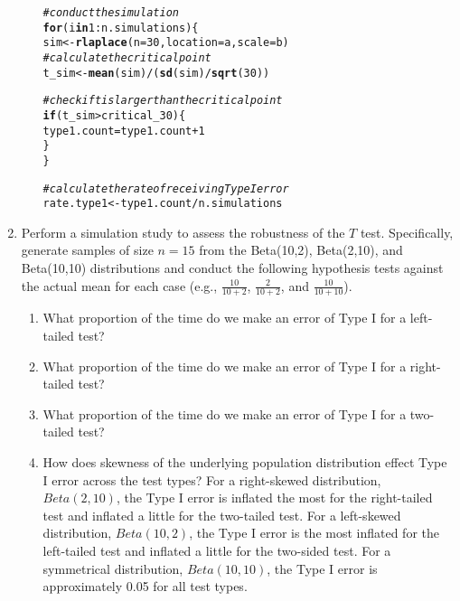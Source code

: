 \documentclass{article}\usepackage[]{graphicx}\usepackage[]{xcolor}
\makeatletter
\newcommand{\hlnum}[1]{\textcolor[rgb]{0.686,0.059,0.569}{#1}}%
\newcommand{\hlcom}[1]{\textcolor[rgb]{0.678,0.584,0.686}{\textit{#1}}}%
\newcommand{\hlopt}[1]{\textcolor[rgb]{0,0,0}{#1}}%
\newcommand{\hldef}[1]{\textcolor[rgb]{0.345,0.345,0.345}{#1}}%
\newcommand{\hlkwa}[1]{\textcolor[rgb]{0.161,0.373,0.58}{\textbf{#1}}}%
\newcommand{\hlkwb}[1]{\textcolor[rgb]{0.69,0.353,0.396}{#1}}%
\newcommand{\hlkwc}[1]{\textcolor[rgb]{0.333,0.667,0.333}{#1}}%
\newcommand{\hlkwd}[1]{\textcolor[rgb]{0.737,0.353,0.396}{\textbf{#1}}}%
\newenvironment{kframe}{%
 \def\at@end@of@kframe{}%
 \ifinner\ifhmode%
  \def\at@end@of@kframe{\end{minipage}}%
  \begin{minipage}{\columnwidth}%
 \fi\fi%
 \def\FrameCommand##1{\hskip\@totalleftmargin \hskip-\fboxsep
 \colorbox{shadecolor}{##1}\hskip-\fboxsep
     \hskip-\linewidth \hskip-\@totalleftmargin \hskip\columnwidth}%
 \MakeFramed {\advance\hsize-\width
   \@totalleftmargin\z@ \linewidth\hsize
   \@setminipage}}%
 {\par\unskip\endMakeFramed%
 \at@end@of@kframe}
\newenvironment{knitrout}{}{} %
\makeatother
\begin{document}
\begin{enumerate}
\begin{enumerate}
\begin{knitrout}
\begin{kframe}
\begin{alltt}
\hlcom{#conduct the simulation}
\hlkwa{for} \hldef{(i} \hlkwa{in} \hlnum{1}\hlopt{:}\hldef{n.simulations)\{}
\hldef{sim} \hlkwb{<-} \hlkwd{rlaplace}\hldef{(}\hlkwc{n} \hldef{=} \hlnum{30}\hldef{,} \hlkwc{location} \hldef{= a,} \hlkwc{scale} \hldef{= b)}
\hlcom{#calculate the critical point}
\hldef{t_sim} \hlkwb{<-} \hlkwd{mean}\hldef{(sim)}\hlopt{/} \hldef{(}\hlkwd{sd}\hldef{(sim)}\hlopt{/}\hlkwd{sqrt}\hldef{(}\hlnum{30}\hldef{))}

\hlcom{#check if t is larger than the critical point}
\hlkwa{if} \hldef{(t_sim} \hlopt{>} \hldef{critical_30)\{}
  \hldef{type1.count} \hlkwb{=} \hldef{type1.count} \hlopt{+} \hlnum{1}
\hldef{\}}
\hldef{\}}

\hlcom{#calculate the rate of receiving Type I error }
\hldef{rate.type1} \hlkwb{<-} \hldef{type1.count}\hlopt{/}\hldef{n.simulations}
\end{alltt}
\end{kframe}
\end{knitrout}
\end{enumerate}
  \item Perform a simulation study to assess the robustness of the $T$ test. 
  Specifically, generate samples of size $n=15$ from the Beta(10,2), Beta(2,10), 
  and Beta(10,10) distributions and conduct the following hypothesis tests against 
  the actual mean for each case (e.g., $\frac{10}{10+2}$, $\frac{2}{10+2}$, and 
  $\frac{10}{10+10}$). 
  \begin{enumerate}
    \item What proportion of the time do we make an error of Type I for a
    left-tailed test?
    \item What proportion of the time do we make an error of Type I for a
    right-tailed test?
    \item What proportion of the time do we make an error of Type I for a
    two-tailed test?
    \item How does skewness of the underlying population distribution effect
    Type I error across the test types?
    For a right-skewed distribution, $Beta(2,10)$, the Type I error is inflated the most for the right-tailed test and inflated a little for the two-tailed test. For a left-skewed distribution, $Beta(10,2)$, the Type I error is the most inflated for the left-tailed test and inflated a little for the two-sided test. For a symmetrical distribution, $Beta(10,10)$, the Type I error is approximately 0.05 for all test types.

\end{enumerate}
\end{enumerate}
\end{document}
